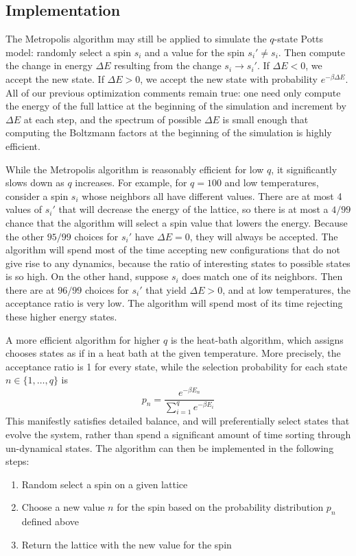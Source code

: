 \documentclass[twocolumn,aps,prl]{revtex4-1} %
\begin{document}
\subsection{Implementation}
The Metropolis algorithm may still be applied to simulate the $q$-state Potts model: randomly select a spin $s_i$ and a value for the spin $s_i' \neq s_i$. Then compute the change in energy $\Delta E$ resulting from the change $s_i \to s_i'$. If $\Delta E < 0$, we accept the new state. If $\Delta E > 0$, we accept the new state with probability $e^{-\beta \Delta E}$. All of our previous optimization comments remain true: one need only compute the energy of the full lattice at the beginning of the simulation and increment by $\Delta E$ at each step, and the spectrum of possible $\Delta E$ is small enough that computing the Boltzmann factors at the beginning of the simulation is highly efficient.

While the Metropolis algorithm is reasonably efficient for low $q$, it significantly slows down as $q$ increases. For example, for $q = 100$ and low temperatures, consider a spin $s_i$ whose neighbors all have different values. There are at most 4 values of $s_i'$ that will decrease the energy of the lattice, so there is at most a $4/99$ chance that the algorithm will select a spin value that lowers the energy. Because the other $95/99$ choices for $s_i'$ have $\Delta E = 0$, they will always be accepted. The algorithm will spend most of the time accepting new configurations that do not give rise to any dynamics, because the ratio of interesting states to possible states is so high. On the other hand, suppose $s_i$ does match one of its neighbors. Then there are at $96/99$ choices for $s_i'$ that yield $\Delta E > 0$, and at low temperatures, the acceptance ratio is very low. The algorithm will spend most of its time rejecting these higher energy states. 

A more efficient algorithm for higher $q$ is the heat-bath algorithm, which assigns chooses states as if in a heat bath at the given temperature. More precisely, the acceptance ratio is 1 for every state, while the selection probability for each state $n \in \{1,\ldots,q\}$ is
\begin{equation}
	p_n = \frac{e^{-\beta E_n}}{\sum_{i=1}^q e^{-\beta E_i}}
\end{equation}
This manifestly satisfies detailed balance, and will preferentially select states that evolve the system, rather than spend a significant amount of time sorting through un-dynamical states. The algorithm can then be implemented in the following steps:
\begin{enumerate}
	\item Random select a spin on a given lattice
	\item Choose a new value $n$ for the spin based on the probability distribution $p_n$ defined above
	\item Return the lattice with the new value for the spin
\end{enumerate}
\end{document}
